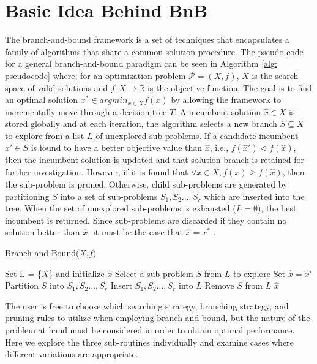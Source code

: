 \section{Basic Idea Behind BnB}
	The branch-and-bound framework is a set of techniques that encapsulates a family of algorithms that share a common solution procedure. 
	The pseudo-code for a general branch-and-bound paradigm can be seen in Algorithm \ref{alg: pseudocode} where, for an optimization problem $\mathscr{P}=(X,f)$, $X$ is the search space of valid solutions and $f: X \rightarrow \mathbb{R}$ is the objective function. 
	The goal is to find an optimal solution $x^* \in argmin_{x\in X}f(x)$ by allowing the framework to incrementally move through a decision tree $T$.
	A incumbent solution $\hat{x}\in X$ is stored globally and at each iteration, the algorithm selects a new branch $S\subseteq X$ to explore from a list $L$ of unexplored sub-problems. 
	If a candidate incumbent $\hat{x}'\in S$ is found to have a better objective value than $\hat{x}$, i.e., $f(\hat{x}') < f(\hat{x})$, then the incumbent solution is updated and that solution branch is retained for further investigation.
	However, if it is found that $\forall x \in X, f(x) \geq f(\hat{x})$, then the sub-problem is pruned. 
	Otherwise, child sub-problems are generated by partitioning $S$ into a set of sub-problems $S_1, S_2 \dots ,S_r$ which are inserted into the tree.
	When the set of unexplored sub-problems is exhausted ($L = \emptyset$), the best incumbent is returned. 
	Since sub-problems are discarded if they contain no solution better than $\hat{x}$, it must be the case that $\hat{x} = x^*$ \cite{morrison2016branch, huang2021branch,virdi2020development}.
		\begin{algorithm}[H]
			\caption{Branch-and-Bound($X$,$f$) }
			\begin{algorithmic}[1]
				\State Set L = \{$X$\} and initialize $\hat{x}$
					\State Select a sub-problem $S$ from $L$ to explore
					\State Set $\hat{x} = \hat{x}'$
					\EndIf
					\State Partition $S$ into $S_1, S_2 \dots ,S_r$
					\State Insert $S_1, S_2 \dots ,S_r$ into $L$
					\EndIf
					\State Remove $S$ from $L$
				\EndWhile
				\State \Return $\hat{x}$
			\end{algorithmic}
		\label{alg: pseudocode}
		\end{algorithm}
	\noindent
		The user is free to choose which searching strategy, branching strategy, and pruning rules to utilize when employing branch-and-bound, but the nature of the problem at hand must be considered in order to obtain optimal performance. Here we explore the three sub-routines individually and examine cases where different variations are appropriate. 
		
		
		
